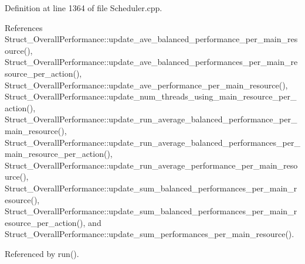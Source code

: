 Definition at line 1364 of file Scheduler.\-cpp.



References Struct\-\_\-\-Overall\-Performance\-::update\-\_\-ave\-\_\-balanced\-\_\-performance\-\_\-per\-\_\-main\-\_\-resource(), Struct\-\_\-\-Overall\-Performance\-::update\-\_\-ave\-\_\-balanced\-\_\-performances\-\_\-per\-\_\-main\-\_\-resource\-\_\-per\-\_\-action(), Struct\-\_\-\-Overall\-Performance\-::update\-\_\-ave\-\_\-performance\-\_\-per\-\_\-main\-\_\-resource(), Struct\-\_\-\-Overall\-Performance\-::update\-\_\-num\-\_\-threads\-\_\-using\-\_\-main\-\_\-resource\-\_\-per\-\_\-action(), Struct\-\_\-\-Overall\-Performance\-::update\-\_\-run\-\_\-average\-\_\-balanced\-\_\-performance\-\_\-per\-\_\-main\-\_\-resource(), Struct\-\_\-\-Overall\-Performance\-::update\-\_\-run\-\_\-average\-\_\-balanced\-\_\-performances\-\_\-per\-\_\-main\-\_\-resource\-\_\-per\-\_\-action(), Struct\-\_\-\-Overall\-Performance\-::update\-\_\-run\-\_\-average\-\_\-performance\-\_\-per\-\_\-main\-\_\-resource(), Struct\-\_\-\-Overall\-Performance\-::update\-\_\-sum\-\_\-balanced\-\_\-performances\-\_\-per\-\_\-main\-\_\-resource(), Struct\-\_\-\-Overall\-Performance\-::update\-\_\-sum\-\_\-balanced\-\_\-performances\-\_\-per\-\_\-main\-\_\-resource\-\_\-per\-\_\-action(), and Struct\-\_\-\-Overall\-Performance\-::update\-\_\-sum\-\_\-performances\-\_\-per\-\_\-main\-\_\-resource().



Referenced by run().



